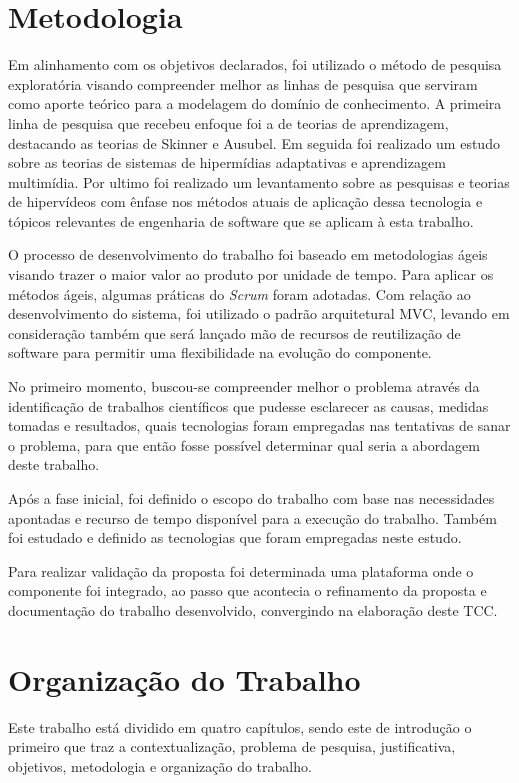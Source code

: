 \section{Metodologia}

Em alinhamento com os objetivos declarados, foi utilizado o método de pesquisa exploratória visando compreender melhor as linhas de pesquisa que serviram como aporte teórico para a modelagem do domínio de conhecimento. A primeira linha de pesquisa que recebeu enfoque foi a de teorias de aprendizagem, destacando as teorias de Skinner e Ausubel. Em seguida foi realizado um estudo sobre as teorias de sistemas de hipermídias adaptativas e aprendizagem multimídia. Por ultimo foi realizado um levantamento sobre as pesquisas e teorias de hipervídeos com ênfase nos métodos atuais de aplicação dessa tecnologia e tópicos relevantes de engenharia de software que se aplicam à esta trabalho.

O processo de desenvolvimento do trabalho foi baseado em metodologias ágeis visando trazer o maior valor ao produto por unidade de tempo. Para aplicar os métodos ágeis, algumas práticas do \textit{Scrum} foram adotadas. Com relação ao desenvolvimento do sistema, foi utilizado o padrão arquitetural MVC, levando em consideração também que será lançado mão de recursos de reutilização de software para permitir uma flexibilidade na evolução do componente.

No primeiro momento, buscou-se compreender melhor o problema através da identificação de trabalhos científicos que pudesse esclarecer as causas, medidas tomadas e resultados, quais tecnologias foram empregadas nas tentativas de sanar o problema, para que então fosse possível determinar qual seria a abordagem deste trabalho.

Após a fase inicial, foi definido o escopo do trabalho com base nas necessidades apontadas e recurso de tempo disponível para a execução do trabalho. Também foi estudado e definido as tecnologias que foram empregadas neste estudo.

Para realizar validação da proposta foi determinada uma plataforma onde o componente foi integrado, ao passo que acontecia o refinamento da proposta e documentação do trabalho desenvolvido, convergindo na elaboração deste TCC.

\section{Organização do Trabalho}

Este trabalho está dividido em quatro capítulos, sendo este de introdução o primeiro que traz a contextualização, problema de pesquisa, justificativa, objetivos, metodologia e organização do trabalho.

